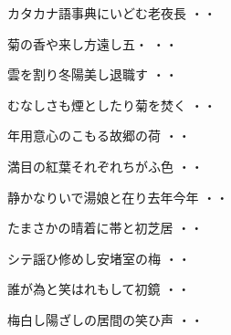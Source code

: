 \begin{shiika}カタカナ語事典にいどむ老夜長
\hfill{・・}\end{shiika}
\vspace{0.6cm}
\begin{shiika}菊の香や来し方遠し五・
\hfill{・・}\end{shiika}
\vspace{0.6cm}
\begin{shiika}雲を割り冬陽美し退職す
\hfill{・・}\end{shiika}
\vspace{0.6cm}
\begin{shiika}むなしさも煙としたり菊を焚く
\hfill{・・}\end{shiika}
\vspace{0.6cm}
\begin{shiika}年用意心のこもる故郷の荷
\hfill{・・}\end{shiika}
\vspace{0.6cm}
\begin{shiika}満目の紅葉それぞれちがふ色
\hfill{・・}\end{shiika}
\vspace{0.6cm}
\begin{shiika}静かなりいで湯娘と在り去年今年
\hfill{・・}\end{shiika}
\vspace{0.6cm}
\begin{shiika}たまさかの晴着に帯と初芝居
\hfill{・・}\end{shiika}
\vspace{0.6cm}
\begin{shiika}シテ謡ひ修めし安堵室の梅
\hfill{・・}\end{shiika}
\vspace{0.6cm}
\begin{shiika}誰が為と笑はれもして初鏡
\hfill{・・}\end{shiika}
\vspace{0.6cm}
\begin{shiika}梅白し陽ざしの居間の笑ひ声
\hfill{・・}\end{shiika}
\vspace{0.6cm}
